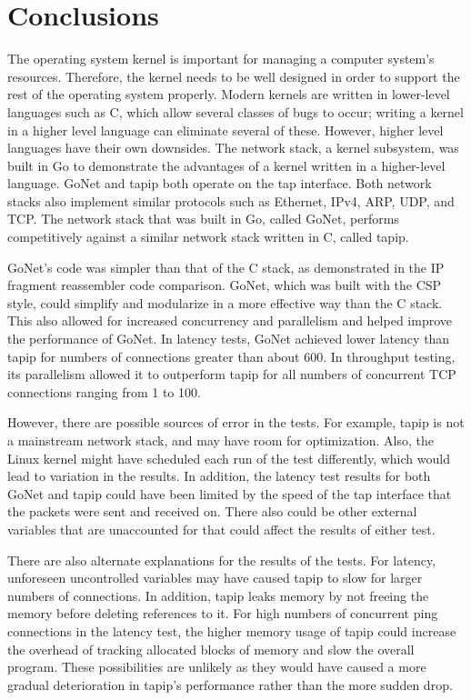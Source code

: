 \documentclass[twocolumn,10pt]{article}
\begin{document}
\section{Conclusions}
The operating system kernel is important for managing a computer system's resources. Therefore, the kernel needs to be well designed in order to support the rest of the operating system properly. Modern kernels are written in lower-level languages such as C, which allow several classes of bugs to occur; writing a kernel in a higher level language can eliminate several of these.
However, higher level languages have their own downsides. The network stack, a kernel subsystem, was built in Go to demonstrate the advantages of a kernel written in a higher-level language.
GoNet and tapip both operate on the tap interface. Both network stacks also implement similar protocols such as Ethernet, IPv4, ARP, UDP, and TCP. The network stack that was built in Go, called GoNet, performs competitively against a similar network stack written in C, called tapip. 

GoNet's code was simpler than that of the C stack, as demonstrated in the IP fragment reassembler code comparison. GoNet, which was built with the CSP style, could simplify and modularize in a more effective way than the C stack. This also allowed for increased concurrency and parallelism and helped improve the performance of GoNet.
In latency tests, GoNet achieved lower latency than tapip for numbers of connections greater than about 600. In throughput testing, its parallelism allowed it to outperform tapip for all numbers of concurrent TCP connections ranging from 1 to 100.

However, there are possible sources of error in the tests. For example, tapip is not a mainstream network stack, and may have room for optimization. Also, the Linux kernel might have scheduled each run of the test differently, which would lead to variation in the results. In addition, the latency test results for both GoNet and tapip could have been limited by the speed of the tap interface that the packets were sent and received on. There also could be other external variables that are unaccounted for that could affect the results of either test. 

There are also alternate explanations for the results of the tests. For latency, unforeseen uncontrolled variables may have caused tapip to slow for larger numbers of connections. 
In addition, tapip leaks memory by not freeing the memory before deleting references to it. For high numbers of concurrent ping connections in the latency test, the higher memory usage of tapip could increase the overhead of tracking allocated blocks of memory and slow the overall program. 
These possibilities are unlikely as they would have caused a more gradual deterioration in tapip's performance rather than the more sudden drop.
\end{document}
